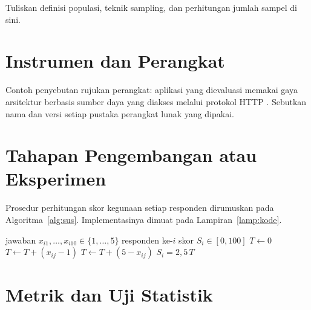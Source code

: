 Tuliskan definisi populasi, teknik sampling, dan perhitungan jumlah
sampel di sini.

\section{Instrumen dan Perangkat}
\label{sec:instrumen}


Contoh penyebutan rujukan perangkat: aplikasi yang dievaluasi memakai
gaya arsitektur berbasis sumber daya yang diakses melalui protokol HTTP
\cite{fielding2000rest}. Sebutkan nama dan versi setiap pustaka
perangkat lunak yang dipakai.

\section{Tahapan Pengembangan atau Eksperimen}
\label{sec:tahapan}


Prosedur perhitungan skor kegunaan setiap responden dirumuskan pada
Algoritma~\ref{alg:sus}. Implementasinya dimuat pada
Lampiran~\ref{lamp:kode}.

\begin{algorithm}[htbp]
  \caption{Contoh perhitungan skor SUS per responden}
  \label{alg:sus}
  \begin{algorithmic}[1]
    \Require jawaban $x_{i1},\dots,x_{i10} \in \{1,\dots,5\}$ responden ke-$i$
    \Ensure skor $S_i \in [0,100]$
    \State $T \gets 0$
        \State $T \gets T + (x_{ij} - 1)$
      \Else
        \State $T \gets T + (5 - x_{ij})$
      \EndIf
    \EndFor
    \State \Return $S_i = 2,5\,T$
  \end{algorithmic}
\end{algorithm}

\section{Metrik dan Uji Statistik}
\label{sec:metrik}

